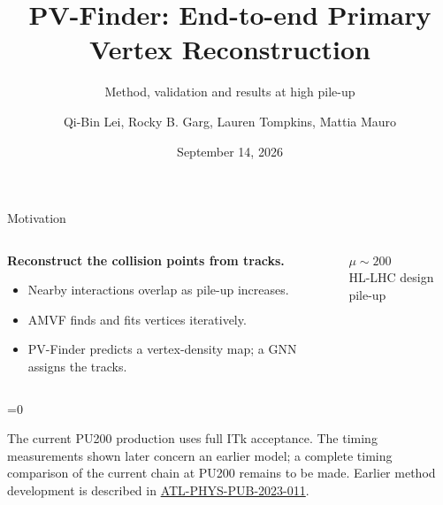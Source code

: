 \documentclass[xcolor=table,aspectratio=169]{beamer}
\title[PV-Finder]{PV-Finder: End-to-end Primary Vertex Reconstruction}
\subtitle{Method, validation and results at high pile-up}
\author[Mattia Mauro]{Qi-Bin Lei, Rocky B. Garg, Lauren Tompkins, \textcolor{pennred}{Mattia Mauro}}
\institute[]{Stanford University}
\date{September 14, 2026}
\def\thisframelogos{}
\newcommand{\framelogo}[1]{\def\thisframelogos{#1}}
\providecommand{\talkbuild}{0}
\newcommand{\readingonly}[1]{\ifnum\talkbuild=0\relax#1\fi}
\newcommand{\readingnote}[1]{\readingonly{\par\vspace{.35em}%
  {\footnotesize\color{black!65}#1\par}}}
\newcommand{\takeaway}[1]{\par\vspace{.65em}{\centering
  \setlength{\fboxsep}{7pt}\colorbox{pennred!5}{\parbox{.94\linewidth}{%
  \centering\small\textcolor{pennred}{#1}}}\par}}
\newcommand{\bigvalue}[2]{{\LARGE\bfseries\textcolor{pennred}{#1}}\\[.4em]{\small #2}\par}
\newcommand{\pubnote}{\href{https://cds.cern.ch/record/2858348}{ATL-PHYS-PUB-2023-011}}
\begin{document}
\framelogo{}

\begin{frame}[plain]\titlepage\end{frame}

\begin{frame}{Motivation}
\relax
\begin{columns}[c]\begin{column}{.53\linewidth}
\textbf{Reconstruct the collision points from tracks.}
\par\vspace{1em}
\begin{itemize}\setlength\itemsep{.7em}
\item Nearby interactions overlap as pile-up increases.
\item AMVF finds and fits vertices iteratively.
\item PV-Finder predicts a vertex-density map; a GNN assigns the tracks.
\end{itemize}
\end{column}\begin{column}{.44\linewidth}\centering
\bigvalue{$\mu\sim200$}{HL-LHC design pile-up}
\par\vspace{1.5em}
\end{column}\end{columns}\takeaway{Accurate vertex positions and track assignments, with practical computing cost.}\readingnote{The current PU200 production uses full ITk acceptance. The timing measurements shown later concern an earlier model; a complete timing comparison of the current chain at PU200 remains to be made. Earlier method development is described in \pubnote.}
\end{frame}
\end{document}
